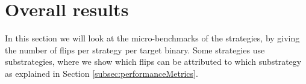 



% 

\section{Overall results}
In this section we will look at the micro-benchmarks of the strategies, by giving the number of flips per strategy per target binary. Some strategies use substrategies, where we show which flips can be attributed to which substrategy as explained in Section \ref{subsec:performanceMetrics}.
